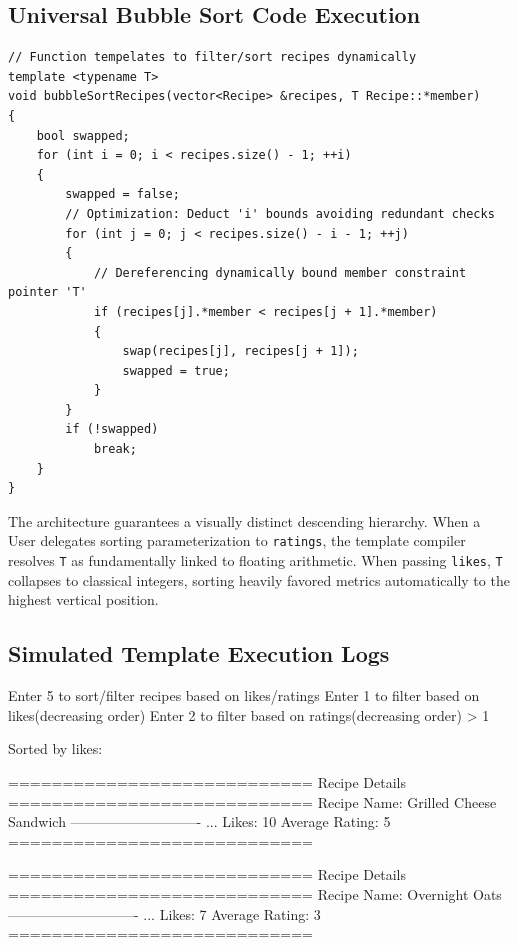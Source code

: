 \documentclass[12pt, a4paper]{article}
\begin{document}
\subsection{Universal Bubble Sort Code Execution}

\begin{lstlisting}[caption={Template Logic executing Data-Agnostic Array Sorting}]
// Function tempelates to filter/sort recipes dynamically
template <typename T>
void bubbleSortRecipes(vector<Recipe> &recipes, T Recipe::*member)
{
    bool swapped;
    for (int i = 0; i < recipes.size() - 1; ++i)
    {
        swapped = false;
        // Optimization: Deduct 'i' bounds avoiding redundant checks
        for (int j = 0; j < recipes.size() - i - 1; ++j)
        {
            // Dereferencing dynamically bound member constraint pointer 'T'
            if (recipes[j].*member < recipes[j + 1].*member)
            {
                swap(recipes[j], recipes[j + 1]);
                swapped = true;
            }
        }
        if (!swapped)
            break;
    }
}
\end{lstlisting}

The architecture guarantees a visually distinct descending hierarchy. When a User delegates sorting parameterization to \texttt{ratings}, the template compiler resolves \texttt{T} as fundamentally linked to floating arithmetic. When passing \texttt{likes}, \texttt{T} collapses to classical integers, sorting heavily favored metrics automatically to the highest vertical position.

\subsection{Simulated Template Execution Logs}

\begin{terminalbox}
Enter 5 to sort/filter recipes based on likes/ratings
Enter 1 to filter based on likes(decreasing order)
Enter 2 to filter based on ratings(decreasing order)
> 1

Sorted by likes:

============================
       Recipe Details       
============================
 Recipe Name: Grilled Cheese Sandwich
----------------------------
...
 Likes: 10
 Average Rating: 5
============================

============================
       Recipe Details       
============================
 Recipe Name: Overnight Oats
----------------------------
...
 Likes: 7
 Average Rating: 3
============================
\end{terminalbox}
\end{document}
